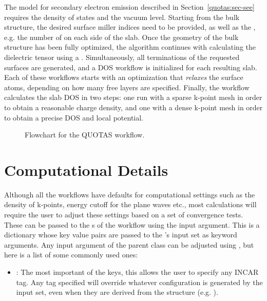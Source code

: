 \begin{refsection}
The model for secondary electron emission described in 
Section~\ref{quotas:sec-see} requires the density of states and the vacuum level. 
Starting from the bulk structure, the desired surface miller indices need to 
be provided, as well as the , e.g. the number of 
 on each side of the slab. Once the geometry of the bulk 
structure has been fully optimized, the algorithm continues with calculating 
the dielectric tensor using a . Simultaneously, all 
terminations of the requested surfaces are generated, and a DOS workflow is 
initialized for each resulting slab. Each of these workflows starts with an 
optimization that \textit{relaxes} the surface atoms, depending on how many 
free layers are specified. Finally, the workflow calculates the slab DOS in 
two steps: one run with a sparse k-point mesh in order to obtain a reasonable 
charge density, and one with a dense k-point mesh in order to obtain a precise 
DOS and local potential. 
 
\begin{figure}[ht] 
 
\caption{\label{automation:fig-quotas} Flowchart for the QUOTAS workflow.} 
\end{figure} 
 
\section{Computational Details} \label{automation:sec-computational}
 
Although all the workflows have defaults for computational settings such as 
the density of k-points, energy cutoff for the plane waves etc., most 
calculations will require the user to adjust these settings based on a set of 
convergence tests. These can be passed to the s of the workflow 
using the  input argument. This is a dictionary 
whose key value pairs are passed to the 
's input 
set as keyword arguments. Any input argument of the parent  
class can be adjusted using , but here is a list of 
some commonly used ones: 
 
\begin{itemize} 
 
\item {}: The most important of the keys, this 
allows the user to specify any INCAR tag. Any tag specified will override 
whatever configuration is generated by the input set, even when they are 
derived from the structure (e.g. ). 
 

\end{itemize}
\end{refsection}
